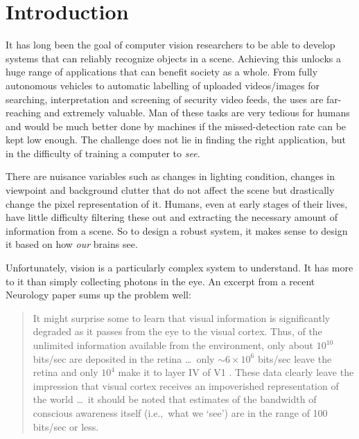 \chapter{Introduction}\label{ch:intro}

\def \path {other}
\def \imgpath {\path/images}

It has long been the goal of computer vision researchers to be able to develop
systems that can reliably recognize objects in a scene. Achieving this unlocks a huge
range of applications that can benefit society as a whole. From fully
autonomous vehicles to automatic labelling of uploaded videos/images for searching,
interpretation and screening of security video feeds, the uses are far-reaching 
and extremely valuable. Man of these tasks are very tedious for humans
and would be much better done by machines if the missed-detection rate can be
kept low enough. The challenge does not lie in finding the
right application, but in the difficulty of training a computer to \emph{see}.

There are nuisance variables such as changes in
lighting condition, changes in viewpoint and background clutter that do not
affect the scene but drastically change the pixel representation of it. 
Humans, even at early stages of their lives, have little difficulty filtering
these out and extracting the necessary amount of information from a scene. So
to design a robust system, it makes sense to design it based on how \emph{our}
brains see. 

Unfortunately, vision is a particularly complex system to understand. It has
more to it than simply collecting photons in the eye.
An excerpt from a recent Neurology paper \cite{raichle_two_2010} sums up the problem
well:

\begin{quotation}
It might surprise some to learn that visual information is significantly
degraded as it passes from the eye to the visual cortex. Thus, of the unlimited
information available from the environment, only about $10^{10}$ bits/sec are
deposited in the retina \ldots\ only $\sim 6\times 10^6$
bits/sec leave the retina and only $10^4$ make it to layer IV of V1
\cite{anderson_directed_2005,tor_norretranders_user_1998}. These data
clearly leave the impression that visual cortex receives an impoverished
representation of the world \ldots\ it should be noted that estimates of the
bandwidth of conscious awareness itself (i.e.,\ what we `see') are in the range
of 100 bits/sec or less\cite{anderson_directed_2005,
tor_norretranders_user_1998}.
\end{quotation}

